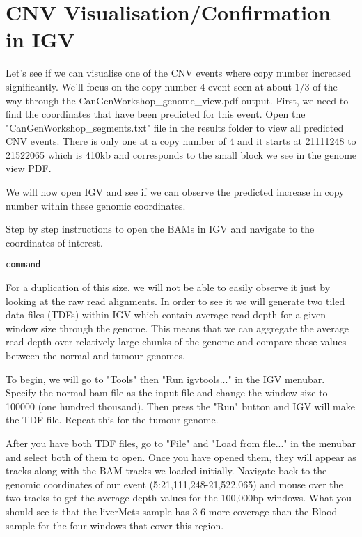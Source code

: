 \newpage


\section{CNV Visualisation/Confirmation in IGV}

Let's see if we can visualise one of the CNV events where copy number increased significantly. We'll focus on the copy number 4 event seen at about 1/3 of the way through the CanGenWorkshop\_genome\_view.pdf output. First, we need to find the coordinates that have been predicted for this event. Open the "CanGenWorkshop\_segments.txt" file in the results folder to view all predicted CNV events. There is only one at a copy number of 4 and it starts at 21111248 to 21522065 which is 410kb and corresponds to the small block we see in the genome view PDF.

We will now open IGV and see if we can observe the predicted increase in copy number within these genomic coordinates.

\begin{steps}
Step by step instructions to open the BAMs in IGV and navigate to the coordinates of interest.

\begin{lstlisting}
command
\end{lstlisting}
\end{steps}

For a duplication of this size, we will not be able to easily observe it just by looking at the raw read alignments. In order to see it we will generate two tiled data files (TDFs) within IGV which contain average read depth for a given window size through the genome. This means that we can aggregate the average read depth over relatively large chunks of the genome and compare these values between the normal and tumour genomes.

To begin, we will go to "Tools" then "Run igvtools..." in the IGV menubar. Specify the normal bam file as the input file and change the window size to 100000 (one hundred thousand). Then press the "Run" button and IGV will make the TDF file. Repeat this for the tumour genome.

After you have both TDF files, go to "File" and "Load from file..." in the menubar and select both of them to open. Once you have opened them, they will appear as tracks along with the BAM tracks we loaded initially. Navigate back to the genomic coordinates of our event (5:21,111,248-21,522,065) and mouse over the two tracks to get the average depth values for the 100,000bp windows. What you should see is that the liverMets sample has 3-6 more coverage than the Blood sample for the four windows that cover this region.


